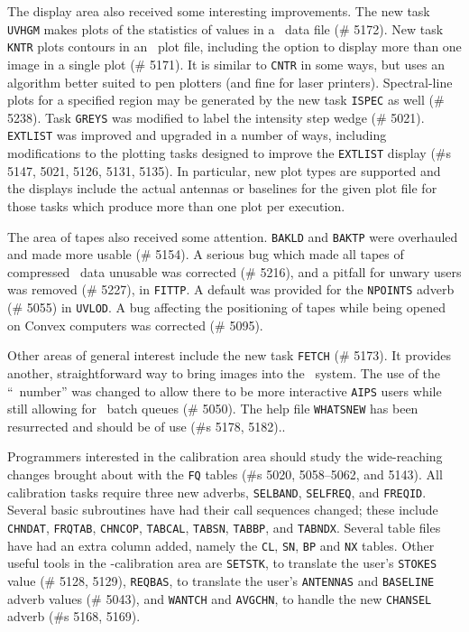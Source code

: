      The display area also received some interesting improvements.
The new task {\tt UVHGM} makes plots of the statistics of values in
a \uv\ data file (\# 5172).  New task {\tt KNTR} plots contours in an
\AIPS\ plot file, including the option to display more than one image
in a single plot (\# 5171).  It is similar to {\tt CNTR} in some ways,
but uses an algorithm better suited to pen plotters (and fine for laser
printers).  Spectral-line plots for a specified region may be generated
by the new task {\tt ISPEC} as well (\# 5238).  Task {\tt GREYS} was
modified to label the intensity step wedge (\# 5021).  {\tt EXTLIST}
was improved and upgraded in a number of ways, including modifications
to the plotting tasks designed to improve the {\tt EXTLIST} display
(\#s 5147, 5021, 5126, 5131, 5135).  In particular, new plot types are
supported and the displays include the actual antennas or baselines for
the given plot file for those tasks which produce more than one plot
per execution.

     The area of tapes also received some attention.  {\tt BAKLD} and
{\tt BAKTP} were overhauled and made more usable (\# 5154).  A serious
bug which made all tapes of compressed \uv\ data unusable was corrected
(\# 5216),  and a pitfall for unwary users was removed (\# 5227), in
\hbox{{\tt FITTP}}.  A default was provided for the {\tt NPOINTS} adverb
(\# 5055) in \hbox{{\tt UVLOD}}.  A bug affecting the positioning of
tapes while being opened on Convex computers was corrected (\# 5095).

     Other areas of general interest include the new task {\tt FETCH}
(\# 5173).  It provides another, straightforward way to bring images
into the \AIPS\ system.  The use of the ``\AIPS\ number'' was changed
to allow there to be more interactive {\tt AIPS} users while still
allowing for \AIPS\ batch queues (\# 5050).  The help file {\tt WHATSNEW}
has been resurrected and should be of use (\#s 5178, 5182)..


     Programmers interested in the calibration area should study the
wide-reaching changes brought about with the {\tt FQ} tables (\#s 5020,
5058--5062, and 5143).  All calibration tasks require three new
adverbs, {\tt SELBAND}, {\tt SELFREQ}, and {\tt FREQID}.  Several
basic subroutines have had their call sequences changed; these include
{\tt CHNDAT}, {\tt FRQTAB}, {\tt CHNCOP}, {\tt TABCAL}, {\tt TABSN},
{\tt TABBP}, and {\tt TABNDX}.  Several table files have had an extra
column added, namely the {\tt CL}, {\tt SN}, {\tt BP} and {\tt NX}
tables.  Other useful tools in the \uv-calibration area are
{\tt SETSTK}, to translate the user's {\tt STOKES} value (\# 5128, 5129),
{\tt REQBAS}, to translate the user's {\tt ANTENNAS} and {\tt BASELINE}
adverb values (\# 5043), and {\tt WANTCH} and {\tt AVGCHN}, to
handle the new {\tt CHANSEL} adverb (\#s 5168, 5169).


